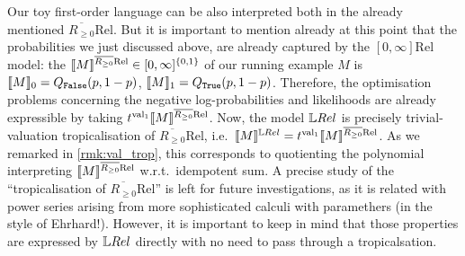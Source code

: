 \begin{remark}
Our toy first-order language can be also interpreted both in the already mentioned $\overline{R_{\geq 0}}\mathrm{Rel}$.
But it is important to mention already at this point that the probabilities we just discussed above, are already captured by the $[0,\infty]\mathrm{Rel}$ model: the $\llbracket M\rrbracket^{\overline{R_{\geq 0}}\mathrm{Rel}}\in[0,\infty]^{\{0,1\}}$ of our running example $M$ is $\llbracket M\rrbracket_0=Q_{\mathtt{False}}(p,1-p)$, $\llbracket M\rrbracket_1=Q_{\mathtt{True}}(p,1-p)$.
Therefore, the optimisation problems concerning the negative log-probabilities and likelihoods are already expressible by taking $\trop^{\mathrm{val}_1}\model{M}^{\overline{R_{\geq 0}}\mathrm{Rel}}$. 
Now, the model $\LREL$ is precisely trivial-valuation tropicalisation of $\overline{R_{\geq 0}}\mathrm{Rel}$, i.e.\ $\model{M}^{\LREL}=\trop^{\mathrm{val}_1}\model{M}^{\overline{R_{\geq 0}}\mathrm{Rel}}$.
As we remarked in \autoref{rmk:val_trop}, this corresponds to quotienting the polynomial interpreting $\llbracket M\rrbracket^{\overline{R_{\geq 0}}\mathrm{Rel}}$ w.r.t.\ idempotent sum.
A precise study of the ``tropicalisation of $\overline{R_{\geq 0}}\mathrm{Rel}$'' is left for future investigations, as it is related with power series arising from more sophisticated calculi with paramethers (in the style of \cite{} {\color{red}Ehrhard!}).
However, it is important to keep in mind that those properties are expressed by $\LREL$ directly with no need to pass through a tropicalsation.
\end{remark}



